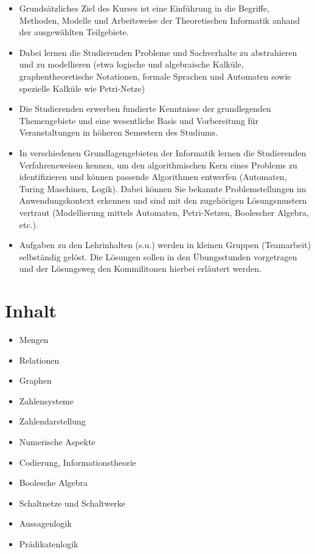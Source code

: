 \begin{itemize}
\tightlist
\item
  Grundsätzliches Ziel des Kurses ist eine Einführung in die Begriffe,
  Methoden, Modelle und Arbeitsweise der Theoretischen Informatik anhand
  der ausgewählten Teilgebiete.
\item
  Dabei lernen die Studierenden Probleme und Sachverhalte zu
  abstrahieren und zu modellieren (etwa logische und algebraische
  Kalküle, graphentheoretische Notationen, formale Sprachen und
  Automaten sowie spezielle Kalküle wie Petri-Netze)
\item
  Die Studierenden erwerben fundierte Kenntnisse der grundlegenden
  Themengebiete und eine wesentliche Basis und Vorbereitung für
  Veranstaltungen in höheren Semestern des Studiums.
\item
  In verschiedenen Grundlagengebieten der Informatik lernen die
  Studierenden Verfahrensweisen kennen, um den algorithmischen Kern
  eines Problems zu identifizieren und können passende Algorithmen
  entwerfen (Automaten, Turing Maschinen, Logik). Dabei können Sie
  bekannte Problemstellungen im Anwendungskontext erkennen und sind mit
  den zugehörigen Lösungsmustern vertraut (Modellierung mittels
  Automaten, Petri-Netzen, Boolescher Algebra, etc.).
\item
  Aufgaben zu den Lehrinhalten (s.u.) werden in kleinen Gruppen
  (Teamarbeit) selbständig gelöst. Die Lösungen sollen in den
  Übungsstunden vorgetragen und der Lösungsweg den Kommilitonen hierbei
  erläutert werden.
\end{itemize}

\hypertarget{inhaltpathlabelmi-2017modulbeschreibungen-bachelorba_theoretischeinformatik1}{%
\section*{Inhalt\label{/mi-2017/modulbeschreibungen-bachelor/BA_TheoretischeInformatik1}}\label{inhaltpathlabelmi-2017modulbeschreibungen-bachelorba_theoretischeinformatik1}}

\begin{itemize}
\tightlist
\item
  Mengen
\item
  Relationen
\item
  Graphen
\item
  Zahlensysteme
\item
  Zahlendarstellung
\item
  Numerische Aspekte
\item
  Codierung, Informationstheorie
\item
  Boolesche Algebra
\item
  Schaltnetze und Schaltwerke
\item
  Aussagenlogik
\item
  Prädikatenlogik
\end{itemize}

